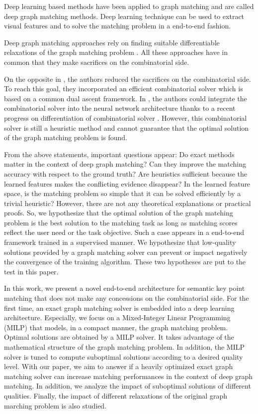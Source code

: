 \documentclass[times,onecolumn,final,authoryear]{article}
\theoremstyle{definition}
\begin{document}
Deep learning based methods have been applied to graph matching \cite{PCA-GM,DGMC,GMN,SinkhornNet} and are called deep graph matching methods. Deep learning technique can be used to extract visual features and to solve the matching problem in a end-to-end fashion. 

Deep graph matching approaches rely on finding suitable differentiable relaxations of the graph matching problem \cite{PCA-GM,DGMC,GMN,SinkhornNet}. All these approaches have in common that they make sacrifices on the combinatorial side.

On the opposite in \cite{BB-GM}, the authors reduced the sacrifices on the combinatorial side. To reach this goal, they incorporated an efficient combinatorial solver \cite{DBLP:journals/corr/SwobodaRAKS16} which is based on a common dual ascent framework. In \cite{BB-GM}, the authors could integrate the combinatorial solver into the neural network architecture thanks to a recent progress on differentiation of combinatorial solver \cite{DBLP:journals/corr/abs-1912-02175}. However, this combinatorial solver \cite{DBLP:journals/corr/SwobodaRAKS16} is still a heuristic method and cannot guarantee that the optimal solution of the graph matching problem is found.

From the above statements, important questions appear: Do exact methods matter in the context of deep graph matching? Can they improve the matching accuracy with respect to the ground truth? Are heuristics sufficient because the learned features makes the conflicting evidence disappear? In the learned feature space, is the matching problem so simple that it can be solved efficiently by a trivial heuristic? However, there are not any theoretical explanations or practical proofs. So, we hypothesize that the optimal solution of the graph matching problem is the best solution to the matching task as long as matching scores reflect the user need or the task objective. Such a case appears in a end-to-end framework trained in a supervised manner.
We hypothesize that low-quality solutions provided by a graph matching solver can prevent or impact negatively the convergence of the training algorithm. These two hypotheses are put to the test in this paper. 

In this work, we present a novel end-to-end architecture for semantic key point matching that does not make any concessions on the combinatorial side. For the first time, an exact graph matching solver is embedded into a deep learning architecture. Especially, we focus on a Mixed-Integer Linear Programming (MILP) that models, in a compact manner, the graph matching problem\cite{Lerouge2017NewBL}. Optimal solutions are obtained by a MILP solver. It takes advantage of the mathematical structure of the graph matching problem. In addition, the MILP solver is tuned to compute suboptimal solutions according to a desired quality level. With our paper, we aim to answer if a heavily optimized exact graph matching solver can increase matching performances in the context of deep graph matching. In addition, we analyze the impact of suboptimal solutions of different qualities. Finally, the impact of different relaxations of the original graph marching problem is also studied.
\end{document}

